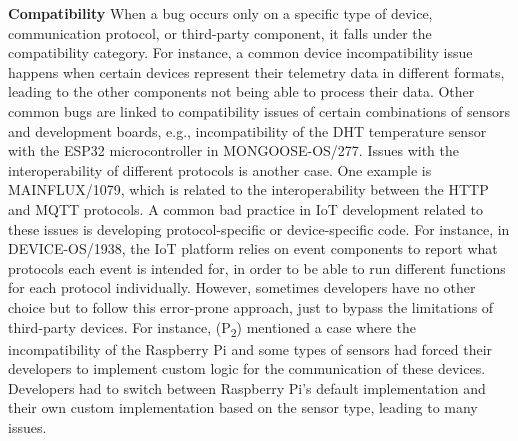 \textbf{Compatibility}
When a bug occurs only on a specific type of device, communication protocol, or third-party component, it falls under the compatibility category. For instance, a common device incompatibility issue happens when certain devices represent their telemetry data in different formats, leading to the other components not being able to process their data. Other common bugs are linked to compatibility issues of certain combinations of sensors and development boards, e.g., incompatibility of the DHT temperature sensor with the ESP32 microcontroller in MONGOOSE-OS/277. Issues with the interoperability of different protocols is another case. One example is MAINFLUX/1079, which is related to the interoperability between the HTTP and MQTT protocols. A common bad practice in IoT development related to these issues is developing protocol-specific or device-specific code. For instance, in DEVICE-OS/1938, the IoT platform relies on event components to report what protocols each event is intended for, in order to be able to run different functions for each protocol individually. However, sometimes developers have no other choice but to follow this error-prone approach, just to bypass the limitations of third-party devices. For instance, (P\textsubscript{2}) mentioned a case where the incompatibility of the Raspberry Pi and some types of sensors had forced their developers to implement custom logic for the communication of these devices. Developers had to switch between Raspberry Pi's default implementation and their own custom implementation based on the sensor type, leading to many issues.



